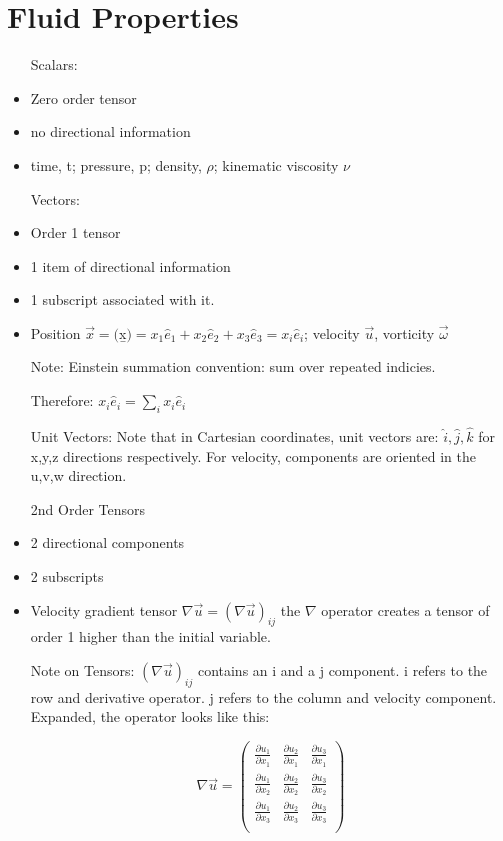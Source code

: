 \documentclass[12pt]{report}
\begin{document}
\section{Fluid Properties}
\begin{itemize}
\item[Scalars:]
\item Zero order tensor
\item no directional information
\item time, t; pressure, p; density, $\rho$; kinematic viscosity $\nu$
\item[Vectors:]
\item Order 1 tensor
\item 1 item of directional information
\item 1 subscript associated with it.
\item Position $\vec{x}=($\b{x}$) =x_1\hat{e}_1 + x_2\hat{e}_2 + x_3\hat{e}_3 = x_i\hat{e}_i $; velocity $\vec{u}$, vorticity $\vec{\omega}$

Note: Einstein summation convention: sum over repeated indicies. 

Therefore: $x_i\hat{e}_i =\sum\limits_{i}x_i\hat{e}_i $

\item[Unit Vectors: ] Note that in Cartesian coordinates, unit vectors are: $\hat{i}, \hat{j}, \hat{k}$ for x,y,z directions respectively. For velocity, components are oriented in the u,v,w direction.

\item[2nd Order Tensors]
\item 2 directional components
\item 2 subscripts
\item Velocity gradient tensor $\nabla\vec{u} = \left(\nabla\vec{u}\right)_{ij}$ the $\nabla$ operator creates a tensor of order 1 higher than the initial variable.
\item[Note on Tensors: ] $\left(\nabla\vec{u}\right)_{ij}$ contains an i and a j component. i refers to the row and derivative operator. j refers to the column and velocity component. Expanded, the operator looks like this:

\[\nabla\vec{u} = \left(
\begin{array}{ccc}
\frac{\partial u_1}{\partial x_1} & \frac{\partial u_2}{\partial x_1} & \frac{\partial u_3}{\partial x_1} \\
\frac{\partial u_1}{\partial x_2} & \frac{\partial u_2}{\partial x_2} & \frac{\partial u_3}{\partial x_2} \\
\frac{\partial u_1}{\partial x_3} & \frac{\partial u_2}{\partial x_3} & \frac{\partial u_3}{\partial x_3} \\
\end{array}\right)\]


\end{itemize}
\end{document}
